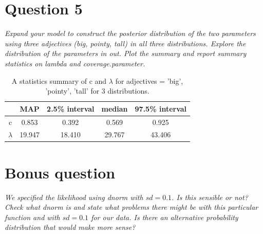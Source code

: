 \documentclass[11pt,a4paper,oneside]{article}
\begin{document}

\section{Question 5}
\label{Q5}
\textit{Expand your model to construct the posterior distribution of the two parameters using three adjectives (big, pointy, tall) in all three distributions. Explore the distribution of the parameters in out. Plot the summary and report summary statistics on lambda and coverage.parameter.}\\

\begin{table}[ht]
\centering
\begin{tabular}{ccccc}
  \hline
  & MAP & 2.5\% interval & median & 97.5\% interval\\ 
  \hline
    c & 0.853 & 0.392 & 0.569 & 0.925\\ 
    $\lambda$ & 19.947 & 18.410 & 29.767 & 43.406\\ 
   \hline
\end{tabular}
\caption{A statistics summary of c and $\lambda$ for adjectives = 'big', 'pointy', 'tall' for 3 distributions.}
\label{question_4}
\end{table}

\section{Bonus question}
\label{bonus}
\textit{We specified the likelihood using dnorm with $sd=0.1$. Is this sensible or not? Check what dnorm is and state what problems there might be with this particular function and with $sd=0.1$ for our data. Is there an alternative probability distribution that would make more sense?}\\

\clearpage 
\printbibliography
\end{document}
